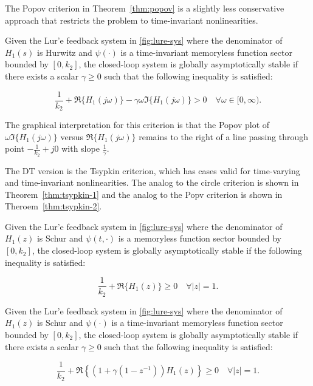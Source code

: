 The Popov criterion in Theorem~\ref{thm:popov} is a slightly less conservative approach that restricts the problem to time-invariant nonlinearities. 

\begin{thm} \label{thm:popov}
	Given the Lur'e feedback system in \autoref{fig:lure-sys} where the denominator of $H_1(s)$ is Hurwitz and $\psi(\cdot)$ is a time-invariant memoryless function sector bounded by $[0, k_2]$, the closed-loop system is globally asymptotically stable if there exists a scalar $\gamma \geq 0$ such that the following inequality is satisfied:
	
	\begin{equation}
		\frac{1}{k_2} + \Re\{H_1(j\omega)\} - \gamma\omega\Im\{H_1(j\omega)\} > 0 \quad \forall \omega \in [0, \infty).
	\end{equation}
\end{thm}

The graphical interpretation for this criterion is that the Popov plot of $\omega\Im\{H_1(j\omega)\}$ versus $\Re\{H_1(j\omega)\}$ remains to the right of a line passing through point $-\frac{1}{k_2} + j0$ with slope $\frac{1}{\gamma}$. 

The \gls{DT} version is the Tsypkin criterion, which has cases valid for time-varying and time-invariant nonlinearities. The analog to the circle criterion is shown in Theorem~\ref{thm:tsypkin-1} and the analog to the Popv criterion is shown in Theroem~\ref{thm:tsypkin-2}.

\begin{thm} \label{thm:tsypkin-1}
	Given the Lur'e feedback system in \autoref{fig:lure-sys} where the denominator of $H_1(z)$ is Schur and $\psi(t,\cdot)$ is a memoryless function sector bounded by $[0, k_2]$, the closed-loop system is globally asymptotically stable if the following inequality is satisfied:
	
	\begin{equation}
		\frac{1}{k_2} + \Re\{H_1(z)\}\geq 0 \quad \forall |z| = 1.
	\end{equation}
\end{thm}

\begin{thm} \label{thm:tsypkin-2}
	Given the Lur'e feedback system in \autoref{fig:lure-sys} where the denominator of $H_1(z)$ is Schur and $\psi(\cdot)$ is a time-invariant memoryless function sector bounded by $[0, k_2]$, the closed-loop system is globally asymptotically stable if there exists a scalar $\gamma \geq 0$ such that the following inequality is satisfied:
	
	\begin{equation}
		\frac{1}{k_2} + \Re\left\{\left(1 + \gamma\left(1 - z^{-1}\right)\right)H_1(z)\right\}\geq 0 \quad \forall |z| = 1.
	\end{equation}
\end{thm}

